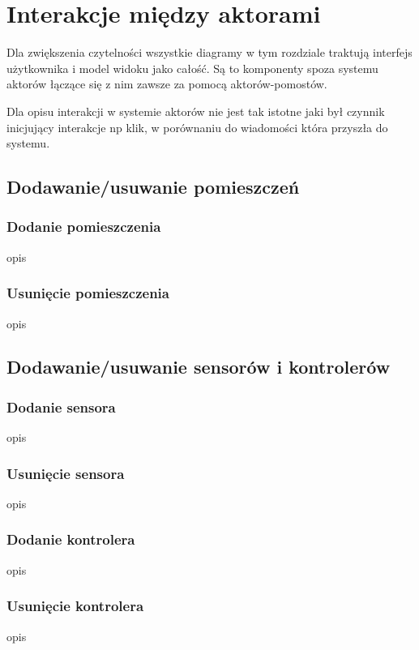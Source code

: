 \chapter{Interakcje między aktorami}
Dla zwiększenia czytelności wszystkie diagramy w tym rozdziale traktują  interfejs użytkownika i model widoku jako całość. Są to komponenty spoza systemu aktorów łączące się z nim zawsze za pomocą aktorów-pomostów.

Dla opisu interakcji w systemie aktorów nie jest tak istotne jaki był czynnik inicjujący interakcje np klik, w porównaniu do wiadomości która przyszła do systemu.

\section{Dodawanie/usuwanie pomieszczeń}

\subsection*{Dodanie pomieszczenia}
opis

\subsection*{Usunięcie pomieszczenia}
opis


\section{Dodawanie/usuwanie sensorów i kontrolerów}
\subsection*{Dodanie sensora}
opis

\subsection*{Usunięcie sensora}
opis

\subsection*{Dodanie kontrolera}
opis

\subsection*{Usunięcie kontrolera}
opis



